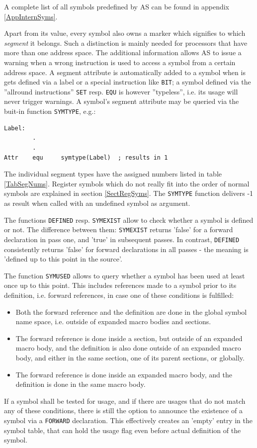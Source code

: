 \documentclass[12pt,twoside]{report}
\newcommand{\tty}[1]{{\tt #1}}
\newcommand{\asname}{{AS}}
\begin{document}
A complete list of all symbols predefined by \asname{} can be found in
appendix \ref{AppInternSyms}.

Apart from its value, every symbol also owns a marker which signifies to
which {\em segment} it belongs.  Such a distinction is mainly needed for
processors that have more than one address space.  The additional
information allows \asname{} to issue a warning when a wrong instruction is used
to access a symbol from a certain address space.  A segment attribute is
automatically added to a symbol when is gets defined via a label or a
special instruction like \tty{BIT}; a symbol defined via the ''allround
instructions'' \tty{SET} resp. \tty{EQU} is however ''typeless'', i.e. its
usage will never trigger warnings.  A symbol's segment attribute may be
queried via the buit-in function \tty{SYMTYPE}, e.g.:
\begin{verbatim}
Label:
        .
        .
Attr    equ     symtype(Label)  ; results in 1
\end{verbatim}
The individual segment types have the assigned numbers listed in table
\ref{TabSegNums}.  Register symbols which do not really fit into the order
of normal symbols are explained in section \ref{SectRegSyms}.  The
\tty{SYMTYPE} function delivers -1 as result when called with an undefined
symbol as argument.

The functions \tty{DEFINED} resp. \tty{SYMEXIST} allow to check whether a
symbol is defined or not.  The difference between them: \tty{SYMEXIST} returns
'false' for a forward declaration in pass one, and 'true' in subsequent passes.
In contrast, \tty{DEFINED} consistently returns 'false' for forward declarations
in all passes - the meaning is 'defined up to this point in the source'.

\label{sect_symused}
The function \tty{SYMUSED} allows to query whether a symbol has been
used at least once up to this point.  This includes references made
to a symbol prior to its definition, i.e. forward references, in case
one of these conditions is fulfilled:
\begin{itemize}
\item{Both the forward reference and the definition are done in the
      global symbol name space, i.e. outside of expanded macro bodies
      and sections.}
\item{The forward reference is done inside a section, but outside of
      an expanded macro body, and the definition is also done outside
      of an expanded macro body, and either in the same section, one
      of its parent sections, or globally.}
\item{The forward reference is done inside an expanded macro body, and
      the definition is done in the same macro body.}
\end{itemize}
If a symbol shall be tested for usage, and if there are usages that
do not match any of these conditions, there is still the option to
announce the existence of a symbol via a \tty{FORWARD} declaration.
This effectively creates an 'empty' entry in the symbol table, that
can hold the usage flag even before actual definition of the symbol.
\end{document}
